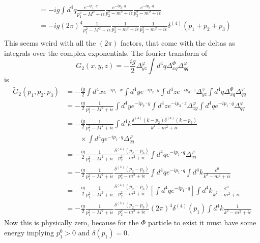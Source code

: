 \documentclass[12pt,a4]{article}
\begin{document}
\begin{enumerate}
\begin{enumerate}
\begin{enumerate}
\begin{align*}
                                        &= -ig \int d^4 q \frac{e^{-ip_1\cdot  q}}{p_1^2 - M^2 + i \epsilon} \frac{e^{-ip_2\cdot  q}}{p_2^2 - m^2 + i \epsilon}\frac{e^{-ip_3\cdot  q}}{p_3^2 - m^2 + i \epsilon}\\
                                        &= -ig (2 \pi)^{4} \frac{1}{p_1^2 - M^2 + i \epsilon} \frac{1}{p_2^2 - m^2 + i \epsilon}\frac{1}{p_3^2 - m^2 + i \epsilon}\delta^{(4)}(p_1 + p_2 + p_3)\\
            \end{align*}
            This seems weird with all the $(2\pi)$ factors, that come with the deltas as integrals over the complex exponentials.
            The fourier transform of
            \begin{equation*}
               G_2(x, y, z) = -\frac{ig}{2}\Delta^{\varphi}_{yz}\int d^4 q\Delta^{\Phi}_{xq} \Delta^{\varphi}_{qq}
            \end{equation*}
            is
            \begin{align*}
              \tilde G_2(p_1, p_2, p_3) &= -\frac{ig}{2}\int d^4x e^{-i p_1\cdot x}\int d^4y e^{-i p_2\cdot y}\int d^4z e^{-i p_3\cdot z}\Delta^{\varphi}_{yz}\int d^4 q\Delta^{\Phi}_{xq} \Delta^{\varphi}_{qq}\\
                                        &= -\frac{ig}{2}\frac{1}{p_1^2 - M^2 + i \epsilon} \int d^4y e^{-i p_2\cdot y}\int d^4z e^{-i p_3\cdot z}\Delta^{\varphi}_{zy}\int d^4 q e^{-ip_1\cdot  q} \Delta^{\varphi}_{qq}\\
                                        &= -\frac{ig}{2}\frac{1}{p_1^2 - M^2 + i \epsilon} \int d^4 k\frac{\delta^{(4)}(k - p_2)\delta^{(4)}(k - p_3)}{k^2 - m^2 + i \epsilon}\\
                                        & \qquad \times \int d^4 q e^{-ip_1\cdot  q} \Delta^{\varphi}_{qq}\\
                                        &= -\frac{ig}{2}\frac{1}{p_1^2 - M^2 + i \epsilon} \frac{\delta^{(4)}(p_2 - p_3)}{p_2^2 - m^2 + i \epsilon}\int d^4 q e^{-ip_1\cdot  q} \Delta^{\varphi}_{qq}\\
                                        &= -\frac{ig}{2}\frac{1}{p_1^2 - M^2 + i \epsilon} \frac{\delta^{(4)}(p_2 - p_3)}{p_2^2 - m^2 + i \epsilon}\int d^4 q e^{-ip_1\cdot  q} \int d^4k\frac{e^0}{k^2 - m^2 + i \epsilon}\\
                                        &= -\frac{ig}{2}\frac{1}{p_1^2 - M^2 + i \epsilon} \frac{\delta^{(4)}(p_2 - p_3)}{p_2^2 - m^2 + i \epsilon}\left[ \int d^4 q e^{-ip_1\cdot  q}\right]\int d^4k\frac{e^0}{k^2 - m^2 + i \epsilon}\\
                                        &= -\frac{ig}{2}\frac{1}{p_1^2 - M^2 + i \epsilon} \frac{\delta^{(4)}(p_2 - p_3)}{p_2^2 - m^2 + i \epsilon}(2\pi)^4\delta^{(4)}(p_1)\int d^4k\frac{1}{k^2 - m^2 + i \epsilon}
            \end{align*}
            Now this is physically zero, because for the $\Phi$ particle to exist it must have some energy implying $p_1^0 > 0$ and $\delta(p_1) = 0$.



\end{enumerate}
\end{enumerate}
\end{enumerate}
\end{document}
